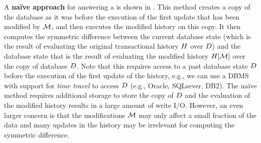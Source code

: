 A \textbf{naïve approach} for answering a \abbrHW is shown in . This method creates a copy of the database as it was before the execution of the first update that has been modified by $\mathcal{M}$, and then executes the modified history on this copy. %
It then computes the symmetric difference between the current database state (which is the result of evaluating the original transactional history $H$ over $D$) and the database state that is the result of evaluating the modified history $H[\mathcal{M}]$ over the copy of database $D$.  %
Note that this requires access to a past database state $D$ before the execution of the first update of the history, e.g., we can use a DBMS with support for \textit{time travel} to access $D$ (e.g., Oracle, SQLsever, DB2).
%
The naïve method requires additional storage to store the copy of $D$ and the evaluation of the modified history results in a large amount of write I/O. %
%
%
%
However, an even larger concern is that the modifications  $\mathcal{M}$ may only affect a small fraction of the data and many updates in the history may be irrelevant for computing the symmetric difference. %


%
%
%

